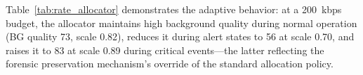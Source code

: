 Table~\ref{tab:rate_allocator} demonstrates the adaptive behavior: at a 200~kbps budget, the allocator maintains high background quality during normal operation (BG quality 73, scale 0.82), reduces it during alert states to 56 at scale 0.70, and raises it to 83 at scale 0.89 during critical events---the latter reflecting the forensic preservation mechanism's override of the standard allocation policy.
